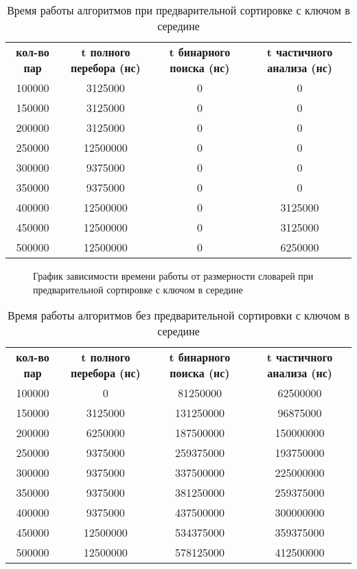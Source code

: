 \begin{table}[ph!]
  \begin{center}
    \captionsetup{justification=raggedright}
     \caption{Время работы алгоритмов при предварительной сортировке с ключом в середине}
    \label{tab:workcost_classic}
    \begin{tabular}{c|c|c|c}
      \textbf{кол-во пар} & \textbf{t полного перебора (нс)}  & \textbf{t бинарного поиска (нс)} & \textbf{t частичного анализа (нс)}\\
	100000 & 3125000 & 0 & 0\\ 
	150000 & 3125000 & 0 & 0\\ 
	200000 & 3125000 & 0 & 0\\ 
	250000 & 12500000 & 0 & 0\\
	300000 & 9375000 & 0 & 0\\
	350000 & 9375000 & 0 & 0\\
	400000 & 12500000 & 0 & 3125000\\
	450000 & 12500000 & 0 & 3125000\\
	500000 & 12500000 & 0 & 6250000\\
      \hline	
    \end{tabular}
  \end{center}
\end{table}

\begin{figure}[ph!]
	\caption{График зависимости времени работы от размерности словарей при предварительной сортировке с ключом в середине}
\end{figure}

\newpage
\begin{table}[ph!]
  \begin{center}
    \captionsetup{justification=raggedright}
     \caption{Время работы алгоритмов без предварительной сортировки с ключом в середине}
    \label{tab:workcost_classic}
    \begin{tabular}{c|c|c|c}
      \textbf{кол-во пар} & \textbf{t полного перебора (нс)}  & \textbf{t бинарного поиска (нс)} & \textbf{t частичного анализа (нс)}\\
	100000 & 0 & 81250000 & 62500000\\
	150000 & 3125000 & 131250000 & 96875000\\
	200000 & 6250000 & 187500000 & 150000000\\
	250000 & 9375000 & 259375000 & 193750000\\
	300000 & 9375000 & 337500000 & 225000000\\
	350000 & 9375000 & 381250000 & 259375000\\
	400000 & 9375000 & 437500000 & 300000000\\
	450000 & 12500000 & 534375000 & 359375000\\
	500000 & 12500000 & 578125000 & 412500000\\
      \hline	
    \end{tabular}
  \end{center}
\end{table}

